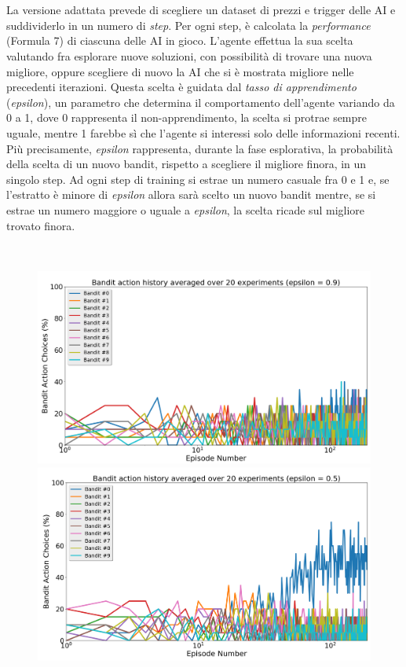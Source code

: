 \documentclass[a4paper,12pt]{report}
\begin{document}
\begin{fig}
\\~\\La versione adattata prevede di scegliere un dataset di prezzi e trigger delle AI e suddividerlo in un numero di \textit{step}. Per ogni step, è calcolata la \textit{performance} (Formula 7) di ciascuna delle AI in gioco. L'agente effettua la sua scelta valutando fra esplorare nuove soluzioni, con possibilità di trovare una nuova migliore, oppure scegliere di nuovo la AI che si è mostrata migliore nelle precedenti iterazioni. Questa scelta è guidata dal \textit{tasso di apprendimento} (\textit{epsilon}), un parametro che determina il comportamento dell'agente variando da 0 a 1, dove 0 rappresenta il non-apprendimento, la scelta si protrae sempre uguale, mentre 1 farebbe sì che l'agente si interessi solo delle informazioni recenti.\\ Più precisamente, \textit{epsilon} rappresenta, durante la fase esplorativa, la probabilità della scelta di un nuovo bandit, rispetto a scegliere il migliore finora, in un singolo step. Ad ogni step di training si estrae un numero casuale fra 0 e 1 e, se l'estratto è minore di \textit{epsilon} allora sarà scelto un nuovo bandit mentre, se si estrae un numero maggiore o uguale a \textit{epsilon}, la scelta ricade sul migliore trovato finora.\\
\begin{fig}
	\\
	\begin{subfigure}{\linewidth}
		\includegraphics[width=.5\linewidth]{bandit_choice_09}
		\includegraphics[width=.5\linewidth]{bandit_choice_05}
	\end{subfigure}
	\begin{subfigure}{\linewidth}

\end{subfigure}
\end{fig}
\end{fig}
\end{document}
